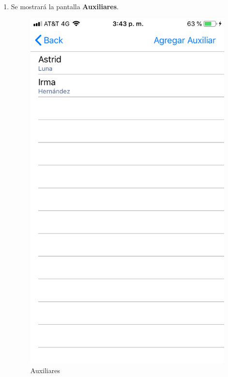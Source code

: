 \begin{enumerate}
	\item Se mostrará la pantalla \textbf{Auxiliares}. 
	\newpage
	\begin{figure}[!htbp]			
		\hypertarget{fig:Auxiliares2}{\hspace{1pt}}
		\begin{center}
			\includegraphics[height=0.4\textheight]{Paciente/ConsultarAuxiliar/images/Auxiliares}
			\caption{Auxiliares}
			\label{fig:Auxiliares2}
		\end{center}
	\end{figure}

\end{enumerate}

